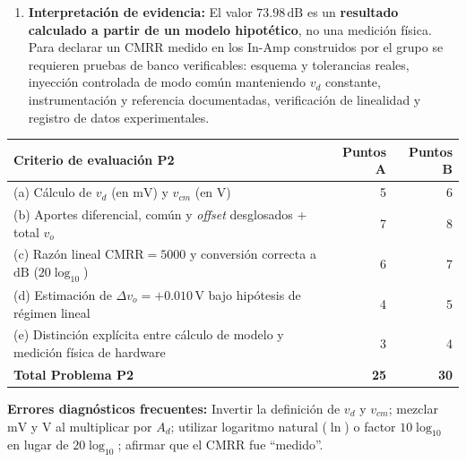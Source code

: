 \documentclass[10pt, a4paper]{article}
\begin{document}
\begin{enumerate}
    \begin{equation}
        \Delta v_o = A_{cm}\Delta v_{cm} = (0.020\,\mathrm{V/V})(+0.50\,\mathrm{V}) = +0.010\,\mathrm{V} = +10\,\mathrm{mV}.
    \end{equation}
    \item \textbf{Interpretación de evidencia:} El valor $73.98\,\mathrm{dB}$ es un \textbf{resultado calculado a partir de un modelo hipotético}, no una medición física. Para declarar un CMRR medido en los In-Amp construidos por el grupo se requieren pruebas de banco verificables: esquema y tolerancias reales, inyección controlada de modo común manteniendo $v_d$ constante, instrumentación y referencia documentadas, verificación de linealidad y registro de datos experimentales.
\end{enumerate}

\begin{table}[htbp]
    \centering
    \footnotesize
    \begin{tabularx}{\textwidth}{@{}Xrr@{}}
        \toprule
        \textbf{Criterio de evaluación P2} & \textbf{Puntos A} & \textbf{Puntos B} \\
        \midrule
        (a) Cálculo de $v_d$ (en $\mathrm{mV}$) y $v_{cm}$ (en $\mathrm{V}$) & 5 & 6 \\
        (b) Aportes diferencial, común y \textit{offset} desglosados + total $v_o$ & 7 & 8 \\
        (c) Razón lineal $\mathrm{CMRR} = 5000$ y conversión correcta a $\mathrm{dB}$ ($20\log_{10}$) & 6 & 7 \\
        (d) Estimación de $\Delta v_o = +0.010\,\mathrm{V}$ bajo hipótesis de régimen lineal & 4 & 5 \\
        (e) Distinción explícita entre cálculo de modelo y medición física de hardware & 3 & 4 \\
        \midrule
        \textbf{Total Problema P2} & \textbf{25} & \textbf{30} \\
        \bottomrule
    \end{tabularx}
\end{table}

\noindent\textbf{Errores diagnósticos frecuentes:} Invertir la definición de $v_d$ y $v_{cm}$; mezclar $\mathrm{mV}$ y $\mathrm{V}$ al multiplicar por $A_d$; utilizar logaritmo natural ($\ln$) o factor $10\log_{10}$ en lugar de $20\log_{10}$; afirmar que el CMRR fue ``medido''.

\end{document}
